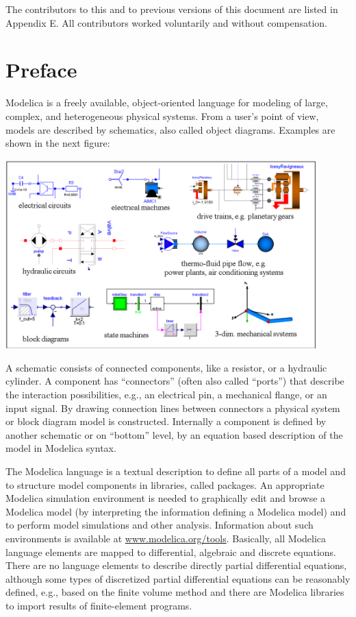 \documentclass[10pt,a4paper]{report}
\begin{document}
The contributors to this and to previous versions of this document are
listed in Appendix E. All contributors worked voluntarily and without
compensation.

\tableofcontents

\chapter*{Preface}

Modelica is a freely available, object-oriented language for modeling of
large, complex, and heterogeneous physical systems. From a user's point
of view, models are described by schematics, also called object
diagrams. Examples are shown in the next figure:

\begin{center}
\includegraphics[width=0.9\textwidth]{media/image2}
\end{center}

A schematic consists of connected components, like a resistor, or a
hydraulic cylinder. A component has ``connectors'' (often also called
``ports'') that describe the interaction possibilities, e.g., an
electrical pin, a mechanical flange, or an input signal. By drawing
connection lines between connectors a physical system or block diagram
model is constructed. Internally a component is defined by another
schematic or on ``bottom'' level, by an equation based description of
the model in Modelica syntax.

The Modelica language is a textual description to define all parts of a
model and to structure model components in libraries, called packages.
An appropriate Modelica simulation environment is needed to graphically
edit and browse a Modelica model (by interpreting the information
defining a Modelica model) and to perform model simulations and other
analysis. Information about such environments is available at
\href{http://www.modelica.org/tools}{www.modelica.org/tools}. Basically,
all Modelica language elements are mapped to differential, algebraic and
discrete equations. There are no language elements to describe directly
partial differential equations, although some types of discretized
partial differential equations can be reasonably defined, e.g., based on
the finite volume method and there are Modelica libraries to import
results of finite-element programs.
\end{document}
